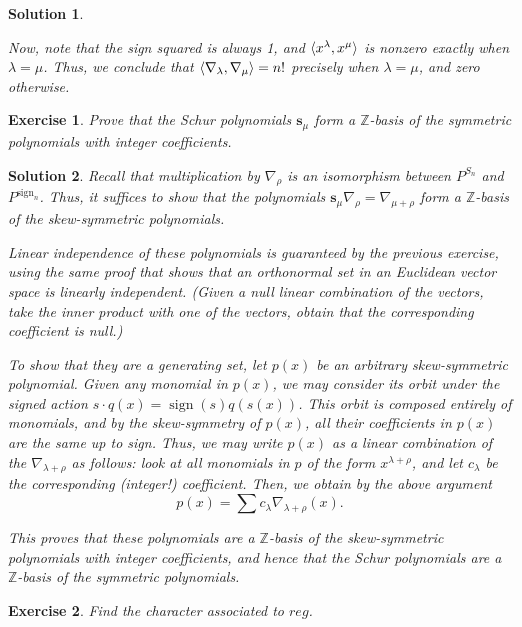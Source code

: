 \documentclass{article}
\newtheorem{ex}{Exercise}
\theoremstyle{nonumberplain}
\newtheorem{sol}{Solution}
\newcommand{\Z}{\mathbb{Z}}
\newcommand{\schur}{\mathbf{s}}
\newcommand{\reg}{\mathit{reg}}
\DeclareMathOperator{\sign}{sign}
\DeclarePairedDelimiter{\braket}{\langle}{\rangle}
\begin{document}
\begin{sol}
\begin{enumerate}
Now, note that the sign squared is always 1, and $\braket{x^\lambda, x^\mu}$ is nonzero exactly when $\lambda = \mu$. Thus, we conclude that $\braket{\nabla_\lambda, \nabla_\mu} = n!$ precisely when $\lambda = \mu$, and zero otherwise.
\end{enumerate}
\end{sol}

\begin{ex}
Prove that the Schur polynomials $\schur_\mu$ form a $\Z$-basis of the symmetric polynomials with integer coefficients.
\end{ex}

\begin{sol}
Recall that multiplication by $\nabla_\rho$ is an isomorphism between $P^{S_n}$ and $P^{\sign_n}$. Thus, it suffices to show that the polynomials $\schur_\mu \nabla_\rho = \nabla_{\mu + \rho}$ form a $\Z$-basis of the skew-symmetric polynomials.

Linear independence of these polynomials is guaranteed by the previous exercise, using the same proof that shows that an orthonormal set in an Euclidean vector space is linearly independent. (Given a null linear combination of the vectors, take the inner product with one of the vectors, obtain that the corresponding coefficient is null.)

To show that they are a generating set, let $p(x)$ be an arbitrary skew-symmetric polynomial. Given any monomial in $p(x)$, we may consider its orbit under the signed action $s \cdot q(x) = \sign(s) q(s(x))$. This orbit is composed entirely of monomials, and by the skew-symmetry of $p(x)$, all their coefficients in $p(x)$ are the same up to sign. Thus, we may write $p(x)$ as a linear combination of the $\nabla_{\lambda + \rho}$ as follows: look at all monomials in $p$ of the form $x^{\lambda + \rho}$, and let $c_\lambda$ be the corresponding (integer!) coefficient. Then, we obtain by the above argument
\begin{equation}
p(x) = \sum c_\lambda \nabla_{\lambda + \rho}(x).
\end{equation}

This proves that these polynomials are a $\Z$-basis of the skew-symmetric polynomials with integer coefficients, and hence that the Schur polynomials are a $\Z$-basis of the symmetric polynomials.
\end{sol}

\setcounter{ex}{3}

\begin{ex}
Find the character associated to $\reg$.
\end{ex}
\end{document}
